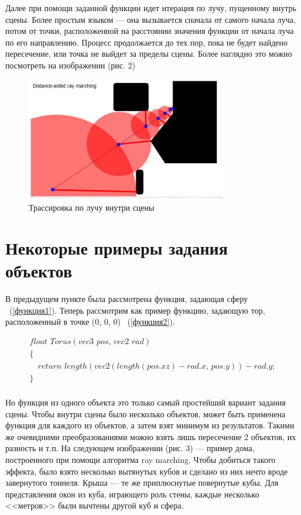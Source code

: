 \documentclass[14pt]{matmex-diploma}
\begin{document}
Далее при помощи заданной функции идет итерация по лучу,
пущенному внутрь сцены. Более простым языком --- она вызывается сначала от самого начала луча, потом от точки, расположенной 
на расстоянии значения функции от начала луча по его направлению. Процесс продолжается до тех пор, пока не будет найдено пересечение,
или точка не выйдет за пределы сцены. Более наглядно это можно посмотреть на изображении (рис. 2)

\begin{figure}[t]
\label{ray}
\centering
\includegraphics[width = 250pt]{ray.jpg}
\caption{Трассировка по лучу внутри сцены}
\end{figure}

\section{Некоторые примеры задания объектов}
В предыдущем пункте была рассмотрена функция, задающая сферу ~(\ref{функция1}). Теперь рассмотрим как пример функцию, задающую тор, расположенный в 
точке (0, 0, 0) ~(\ref{функция2}).

\begin{equation}
\label{функция2}
\begin{array}{ll}
float\,\,Torus(vec3\,\,pos,\, vec2\,\,rad)                                   \\
\{                                                                           \\
\,\,\,\,\,\, return\,\,length(vec2(length(pos.xz) - rad.x,\,pos.y)) - rad.y; \\
\}                                                                           \\
\end{array}
\end{equation}

Но функция из одного объекта это только самый простейший вариант задания сцены. 
Чтобы внутри сцены было несколько объектов, может быть применена функция для каждого из объектов, а затем взят минимум из результатов.
Такими же очевидними преобразованиями можно взять лишь пересечение 2 объектов, их разность и т.п. На следующем изображении (рис. 3) --- пример дома,
построенного при помощи алгоритма ray marching. Чтобы добиться такого эффекта,
было взято несколько вытянутых кубов и сделано из них нечто вроде завернутого тоннеля. Крыша --- те же приплюснутые повернутые кубы. Для представления 
окон из куба, играющего роль стены, каждые несколько <<метров>> были вычтены другой куб и сфера. 
\end{document}
